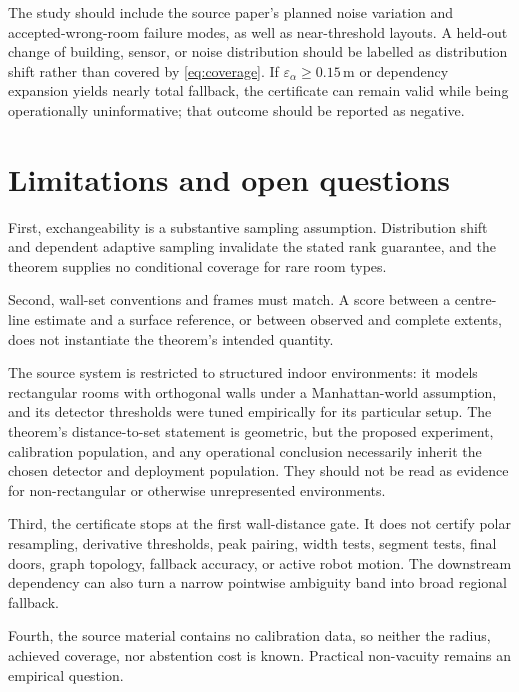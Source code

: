 \documentclass{article}
\begin{document}
The study should include the source paper's planned noise variation and accepted-wrong-room failure modes, as well as near-threshold layouts. A held-out change of building, sensor, or noise distribution should be labelled as distribution shift rather than covered by \eqref{eq:coverage}. If $\varepsilon_\alpha\geq0.15\,\mathrm{m}$ or dependency expansion yields nearly total fallback, the certificate can remain valid while being operationally uninformative; that outcome should be reported as negative.

\section{Limitations and open questions}

First, exchangeability is a substantive sampling assumption. Distribution shift and dependent adaptive sampling invalidate the stated rank guarantee, and the theorem supplies no conditional coverage for rare room types.

Second, wall-set conventions and frames must match. A score between a centre-line estimate and a surface reference, or between observed and complete extents, does not instantiate the theorem's intended quantity.

The source system is restricted to structured indoor environments: it models rectangular rooms with orthogonal walls under a Manhattan-world assumption, and its detector thresholds were tuned empirically for its particular setup. The theorem's distance-to-set statement is geometric, but the proposed experiment, calibration population, and any operational conclusion necessarily inherit the chosen detector and deployment population. They should not be read as evidence for non-rectangular or otherwise unrepresented environments.

Third, the certificate stops at the first wall-distance gate. It does not certify polar resampling, derivative thresholds, peak pairing, width tests, segment tests, final doors, graph topology, fallback accuracy, or active robot motion. The downstream dependency can also turn a narrow pointwise ambiguity band into broad regional fallback.

Fourth, the source material contains no calibration data, so neither the radius, achieved coverage, nor abstention cost is known. Practical non-vacuity remains an empirical question.
\end{document}
